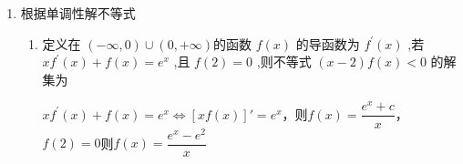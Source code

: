 \begin{enumerate}
\begin{enumerate}
\begin{jieda}
\begin{enumerate}
            \end{enumerate}
        \end{jieda}
        
        \item 设函数 $y = f\left( x\right)$ ,其中 $f\left( x\right)  = {kx} + \sin x,k \geq  1,k \in  \mathbf{R}$ ,定义域为 $D = \left( {-\infty , + \infty }\right)$ . 对于 $t \in  D$ ,定义${S}_{f\left( t\right) } = \{ x \mid  f\left( x\right)  \leq  f\left( t\right) \}$ ,则 ${S}_{f\left( {2025}\right) } =$\blkda{$(-\infty, 2025]$}
        \begin{jieda}
            $f'(x) = k + cosx \geq 0$，因此$f(x)$严增，故${S}_{f\left( t\right) } = \{ x \mid  f\left( x\right)  \leq  f\left( t\right) \} = (0, t]$.
        \end{jieda}
    
    \end{enumerate}


    \item 根据单调性解不等式
    \begin{enumerate}
        \item 定义在 $(-\infty, 0) \cup \left( {0, + \infty }\right)$的函数 $f\left( x\right)$ 的导函数为 ${f}^{\prime }\left( x\right)$ ,若 $x{f}^{\prime }\left( x\right)  + f\left( x\right) = e^x$ ,且 $f\left( 2\right)  = 0$ ,则不等式 $\left( {x - 2}\right) f\left( x\right)  < 0$ 的解集为\blkda{$\left(-\infty, 0\right)$}
        \begin{jieda}
            $x{f}^{\prime }\left( x\right)  + f\left( x\right) = e^x \Longleftrightarrow \left[xf(x)\right]' = e^x$，则$f(x) = \dfrac{e^x+c}{x}$，$f(2) = 0$则$f(x) = \dfrac{e^x-e^2}{x}$


\end{jieda}
\end{enumerate}
\end{enumerate}
